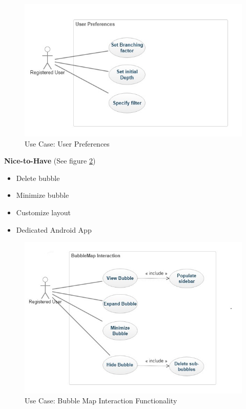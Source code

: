 \documentclass[hidelinks,english]{article}
\begin{document}
			\begin{figure}[!h]
			\includegraphics[width=\linewidth]{User Preferences.jpg}
			\caption{Use Case: User Preferences}
			\label{UseCaseUserPreferences}
			\end{figure}
			\textbf{Nice-to-Have} (See figure \ref{UseCaseBubbleMapInteraction})
			\begin{itemize}
			    \item Delete bubble
			    \item Minimize bubble
			    \item Customize layout
			    \item Dedicated Android App
			\end{itemize}
			\begin{figure}[!h]
				\includegraphics[width=\linewidth]{BubbleMap Interaction.jpg}
				\caption{Use Case: Bubble Map Interaction Functionality}
				\label{UseCaseBubbleMapInteraction}
			\end{figure}
\end{document}

